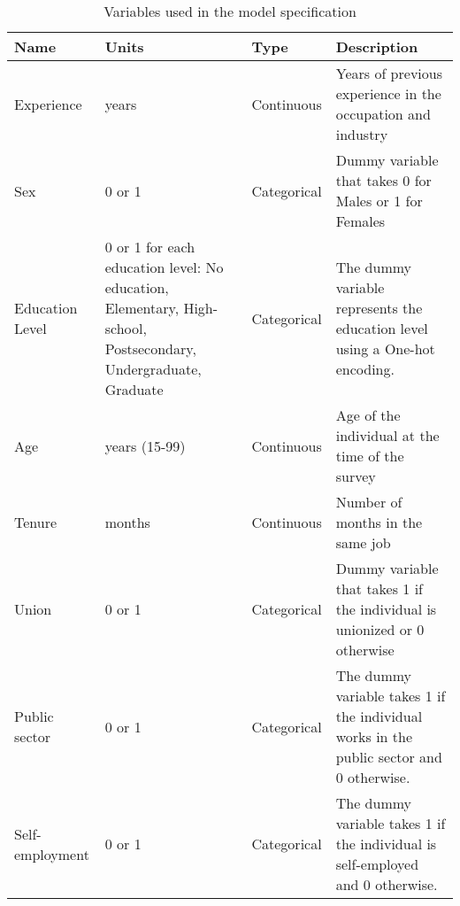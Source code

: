 \renewcommand{\arraystretch}{1.5}
\begin{table}[H]
    \begin{tabular}{p{2cm}p{4cm}p{2cm}p{7cm}}
        \textbf{Name} & \textbf{Units} & \textbf{Type} & \textbf{Description} \\
        \hline
        \rowcolor{lightgray} Experience & years & Continuous & Years of previous experience in the occupation and industry \\

        Sex & 0 or 1 & Categorical & Dummy variable that takes 0 for Males or 1 for Females \\

        \rowcolor{lightgray} Education Level & 0 or 1 for each education level: \newline No education, \newline Elementary, \newline High-school, \newline Postsecondary, \newline Undergraduate, \newline Graduate & Categorical & The dummy variable represents the education level using a One-hot encoding. \\

        Age & years (15-99) & Continuous & Age of the individual at the time of the survey \\

        \rowcolor{lightgray} Tenure & months & Continuous & Number of months in the same job \\

        Union & 0 or 1 & Categorical & Dummy variable that takes 1 if the individual is unionized or 0 otherwise \\

        \rowcolor{lightgray} Public sector & 0 or 1 & Categorical & The dummy variable takes 1 if the individual works in the public sector and 0 otherwise. \\

        Self-employment & 0 or 1 & Categorical & The dummy variable takes 1 if the individual is self-employed and 0 otherwise. \\

        \hline
    \end{tabular}
    \caption{\label{table:model_vars} Variables used in the model specification}
\end{table}

